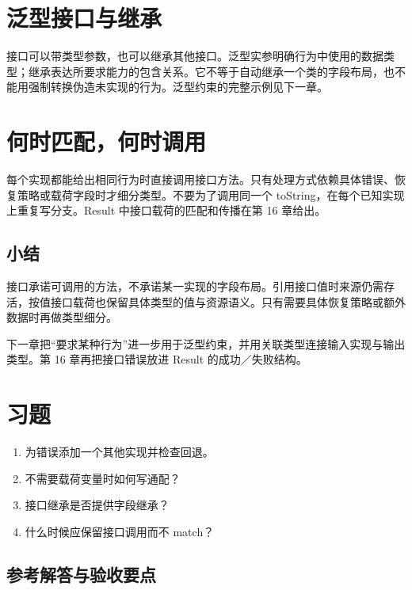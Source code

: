 \section{泛型接口与继承}

接口可以带类型参数，也可以继承其他接口。泛型实参明确行为中使用的数据类型；继承表达所要求能力的包含关系。它不等于自动继承一个类的字段布局，也不能用强制转换伪造未实现的行为。泛型约束的完整示例见下一章。

\section{何时匹配，何时调用}

每个实现都能给出相同行为时直接调用接口方法。只有处理方式依赖具体错误、恢复策略或载荷字段时才细分类型。不要为了调用同一个 toString，在每个已知实现上重复写分支。Result 中接口载荷的匹配和传播在第 16 章给出。

\subsection*{小结}

接口承诺可调用的方法，不承诺某一实现的字段布局。引用接口值时来源仍需存活，按值接口载荷也保留具体类型的值与资源语义。只有需要具体恢复策略或额外数据时再做类型细分。

下一章把“要求某种行为”进一步用于泛型约束，并用关联类型连接输入实现与输出类型。第 16 章再把接口错误放进 Result 的成功／失败结构。

\section{习题}

\begin{enumerate}

\item 为错误添加一个其他实现并检查回退。

\item 不需要载荷变量时如何写通配？

\item 接口继承是否提供字段继承？

\item 什么时候应保留接口调用而不 match？

\end{enumerate}

\subsection*{参考解答与验收要点}

